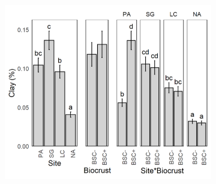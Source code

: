 \begin{figure}[htbp]
\begin{subfigure}[b]{0.32\textwidth}
        \centering
        \includegraphics[width=\linewidth]{img/M1-Figure_2-09.png}
    \end{subfigure}

    \vspace{0.3cm}


\end{figure}
